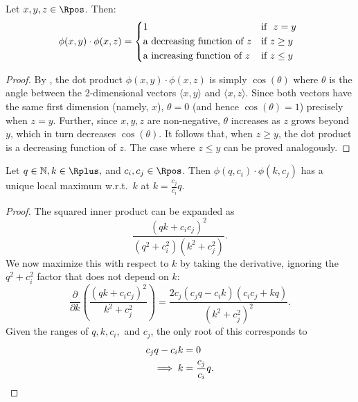 \begin{proposition}
    \label{prop:dot-product-monotone}
    Let $x, y, z \in \Rpos$. Then:
    \begin{equation*}
        \phi(x, y) \cdot \phi(x, z) =
        \begin{cases*}
            1 & \text{if\ } $z = y$ \\
            \text{a decreasing function of\ } z & if $z \geq y$ \\
            \text{a increasing function of\ } z & if $z \leq y$
        \end{cases*}
    \end{equation*}
\end{proposition}

\begin{proof}
    By , the dot product $\phi(x, y) \cdot \phi(x, z)$ is simply $\cos(\theta)$ where $\theta$ is the angle between the 2-dimensional vectors $\langle x, y \rangle$ and $\langle x, z \rangle$. Since both vectors have the same first dimension (namely, $x$), $\theta = 0$ (and hence $\cos(\theta) = 1$) precisely when $z = y$. Further, since $x, y, z$ are non-negative, $\theta$ increases as $z$ grows beyond $y$, which in turn decreases $\cos(\theta)$. It follows that, when $z \geq y$, the dot product is a decreasing function of $z$. The case where $z \leq y$ can be proved analogously.
\end{proof}

\begin{proposition} \label{prop:max}
    Let $q \in \mathbb N, k \in \Rplus,$ and $c_i, c_j \in \Rpos$.
    Then $\phi(q, c_i) \cdot \phi(k, c_j)$
    has a unique local maximum w.r.t.~$k$ at $k = \frac{c_j}{c_i} q$.
\end{proposition}
\begin{proof}
    The squared inner product can be expanded as
    \begin{equation*}
        \frac{(qk + c_i c_j)^2}{(q^2 + c_i^2)(k^2 + c_j^2)} .
    \end{equation*}
    We now maximize this with respect to $k$ by taking the derivative, ignoring the $q^2 + c_i^2$ factor that does not depend on $k$:
    \begin{equation*}
        \frac{\partial}{\partial k} \left( \frac{(qk + c_i c_j)^2}{k^2 + c_j^2} \right) = \frac{2 c_j (c_j q - c_i k) (c_i c_j + kq)}{(k^2 + c_j^2)^2} .
    \end{equation*}
    Given the ranges of $q, k, c_i,$ and $c_j$,
    the only root of this corresponds to
    \begin{align*}
        c_j q - c_i k &= 0 \\
        \implies k &= \frac{c_j}{c_i} q . \qedhere
    \end{align*}
\end{proof}

